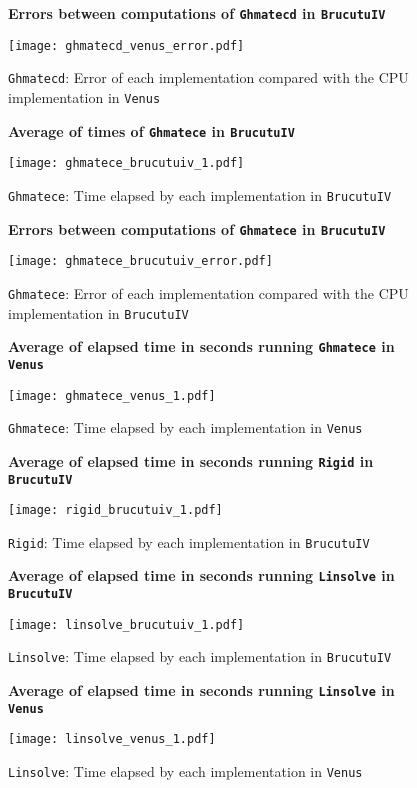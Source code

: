 \begin{figure}[ht]
\centering
\textbf{Errors between computations of \texttt{Ghmatecd} in \texttt{BrucutuIV}}\par\medskip
\texttt{[image: ghmatecd\_venus\_error.pdf]}
\caption{\texttt{Ghmatecd}: Error of each implementation compared with the CPU implementation in \texttt{Venus}}
\label{fig:ghmatecd_venus_error}
\end{figure}

\begin{figure}[ht]
\centering
\textbf{Average of times of \texttt{Ghmatece} in \texttt{BrucutuIV}}\par\medskip
\texttt{[image: ghmatece\_brucutuiv\_1.pdf]}
\caption{\texttt{Ghmatece}: Time elapsed by each implementation in \texttt{BrucutuIV}}
\label{fig:ghmatece_brucutuiv_1}
\end{figure}

\begin{figure}[ht]
\centering
\textbf{Errors between computations of \texttt{Ghmatece} in \texttt{BrucutuIV}}\par\medskip
\texttt{[image: ghmatece\_brucutuiv\_error.pdf]}
\caption{\texttt{Ghmatece}: Error of each implementation compared with the CPU implementation in \texttt{BrucutuIV}}
\label{fig:ghmatece_brucutuiv_error}
\end{figure}

\begin{figure}[ht]
\centering
\textbf{Average of elapsed time in seconds running \texttt{Ghmatece} in \texttt{Venus}}\par\medskip
\texttt{[image: ghmatece\_venus\_1.pdf]}
\caption{\texttt{Ghmatece}: Time elapsed by each implementation in \texttt{Venus}}
\label{fig:ghmatece_venus_1}
\end{figure}

\begin{figure}[ht]
\textbf{Average of elapsed time in seconds running \texttt{Rigid} in \texttt{BrucutuIV}}\par\medskip
\centering
\texttt{[image: rigid\_brucutuiv\_1.pdf]}
\caption{\texttt{Rigid}: Time elapsed by each implementation in \texttt{BrucutuIV}}
\label{fig:rigid_brucutuiv_1}
\end{figure}

\begin{figure}[ht]
\centering
\textbf{Average of elapsed time in seconds running \texttt{Linsolve} in \texttt{BrucutuIV}}\par\medskip
\texttt{[image: linsolve\_brucutuiv\_1.pdf]}
\caption{\texttt{Linsolve}: Time elapsed by each implementation in \texttt{BrucutuIV}}
\label{fig:linsolve_brucutuiv_1}
\end{figure}

\begin{figure}[ht]
\centering
\textbf{Average of elapsed time in seconds running \texttt{Linsolve} in \texttt{Venus}}\par\medskip
\texttt{[image: linsolve\_venus\_1.pdf]}
\caption{\texttt{Linsolve}: Time elapsed by each implementation in \texttt{Venus}}
\label{fig:linsolve_venus_1}
\end{figure}

